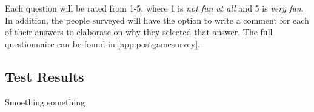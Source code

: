 Each question will be rated from 1-5, where 1 is \emph{not fun at all} and 5 is \emph{very fun}.
In addition, the people surveyed will have the option to write a comment for each of their answers to elaborate on why they selected that answer.
The full questionnaire can be found in \ref{app:postgamesurvey}.

\subsection{Test Results}
Smoething something